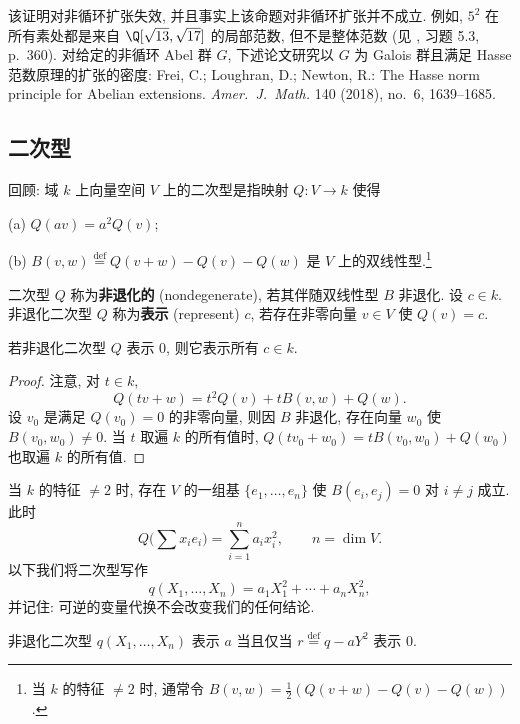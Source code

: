 \begin{remark}\label{rem:viii.3.2}
该证明对非循环扩张失效, 并且事实上该命题对非循环扩张并不成立. 例如, $5^{2}$ 在所有素处都是来自 $\Q[\sqrt{13},\sqrt{17}]$ 的局部范数, 但不是整体范数 (见 \cite{CasselsFrohlich1967}, 习题 5.3, p.~360). 对给定的非循环 Abel 群 $G$, 下述论文研究以 $G$ 为 Galois 群且满足 Hasse 范数原理的扩张的密度: Frei, C.; Loughran, D.; Newton, R.: The Hasse norm principle for Abelian extensions. \emph{Amer.~J.~Math.} 140 (2018), no.~6, 1639--1685.
\end{remark}

\subsection*{二次型}

回顾: 域 $k$ 上向量空间 $V$ 上的二次型是指映射 $Q\colon V\to k$ 使得

(a) $Q(av)=a^{2}Q(v)$;

(b) $B(v,w)\overset{\text{def}}{=}Q(v+w)-Q(v)-Q(w)$ 是 $V$ 上的双线性型.\footnote{当 $k$ 的特征 $\ne 2$ 时, 通常令 $B(v,w)=\frac{1}{2}(Q(v+w)-Q(v)-Q(w))$.}

二次型 $Q$ 称为\textbf{非退化的} (nondegenerate), 若其伴随双线性型 $B$ 非退化. 设 $c\in k$. 非退化二次型 $Q$ 称为\textbf{表示} (represent) $c$, 若存在非零向量 $v\in V$ 使 $Q(v)=c$.

\begin{lemma}\label{lem:viii.3.3}
若非退化二次型 $Q$ 表示 $0$, 则它表示所有 $c\in k$.
\end{lemma}

\begin{proof}
注意, 对 $t\in k$,
\[
Q(tv+w)=t^{2}Q(v)+tB(v,w)+Q(w).
\]
设 $v_0$ 是满足 $Q(v_0)=0$ 的非零向量, 则因 $B$ 非退化, 存在向量 $w_0$ 使 $B(v_0,w_0)\ne 0$. 当 $t$ 取遍 $k$ 的所有值时, $Q(tv_0+w_0)=tB(v_0,w_0)+Q(w_0)$ 也取遍 $k$ 的所有值.
\end{proof}

当 $k$ 的特征 $\ne 2$ 时, 存在 $V$ 的一组基 $\{e_1,\ldots,e_n\}$ 使 $B(e_i,e_j)=0$ 对 $i\ne j$ 成立. 此时
\[
Q\Big(\sum x_ie_i\Big)=\sum_{i=1}^{n}a_ix_i^{2},\qquad n=\dim V.
\]
以下我们将二次型写作
\[
q(X_{1},\ldots,X_{n})=a_{1}X_{1}^{2}+\cdots+a_{n}X_{n}^{2},
\]
并记住: 可逆的变量代换不会改变我们的任何结论.

\begin{lemma}\label{lem:viii.3.4}
非退化二次型 $q(X_{1},\ldots,X_{n})$ 表示 $a$ 当且仅当 $r\overset{\text{def}}{=}q-aY^{2}$ 表示 $0$.
\end{lemma}

